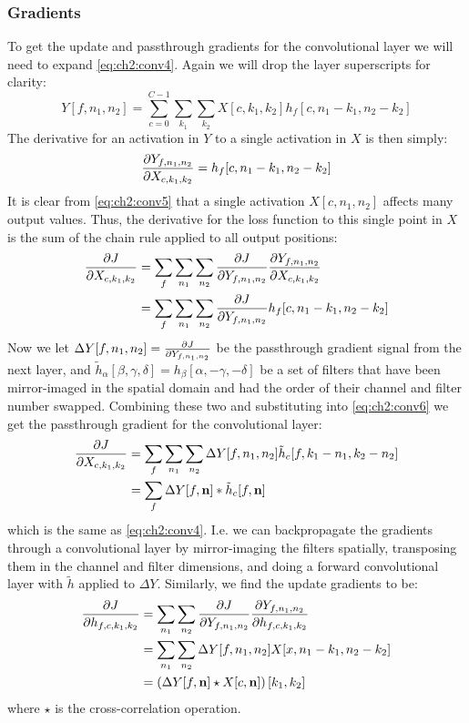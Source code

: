 \subsubsection{Gradients}\label{sec:ch2:conv_grad}
To get the update and passthrough gradients for the convolutional layer we will need to expand
\eqref{eq:ch2:conv4}. Again we will drop the layer superscripts for clarity:
\begin{equation}
  Y[f, n_1, n_2] = \sum_{c=0}^{C-1} \sum_{k_1} \sum_{k_2} X[c, k_1, k_2]
  h_f[c, n_1-k_1, n_2-k_2] \label{eq:ch2:conv5}
\end{equation}
The derivative for an activation in $Y$ to a single activation in $X$ is then
simply:
\begin{equation}
  \frac{\partial Y_{f, n_1, n_2}}{\partial X_{c, k_1, k_2}} = h_f[c, n_1 - k_1, n_2 - k_2]
\end{equation}
It is clear from \eqref{eq:ch2:conv5} that a single activation $X[c, n_1, n_2]$ affects
many output values. Thus, the derivative for the loss function to this single
point in $X$ is the sum of the chain rule applied to all output positions:
\begin{align}
  \frac{\partial J}{\partial X_{c,k_1,k_2}} &= \sum_f \sum_{n_1} \sum_{n_2} \frac{\partial J}{\partial Y_{f, n_1, n_2}}
  \frac{\partial Y_{f, n_1, n_2}}{\partial X_{c,k_1,k_2}} \\
  &= \sum_f \sum_{n_1} \sum_{n_2} \frac{\partial J}{\partial Y_{f, n_1, n_2}} h_f[c, n_1 - k_1, n_2 - k_2] \label{eq:ch2:conv6}
\end{align}
Now we let $\Delta Y[f, n_1, n_2] = \frac{\partial J}{\partial Y_{f, n_1, n_2}}$ be the passthrough gradient
signal from the next layer, and $\tilde{h}_\alpha[\beta, \gamma, \delta] = h_\beta[\alpha, -\gamma, -\delta]$
be a set of filters that have been mirror-imaged in the spatial domain and had
the order of their channel and filter number swapped. Combining these two and
substituting into \eqref{eq:ch2:conv6} we get the passthrough gradient for the
convolutional layer:
\begin{align}
  \frac{\partial J}{\partial X_{c,k_1,k_2}} &= \sum_f \sum_{n_1} \sum_{n_2} \Delta Y[f, n_1, n_2] \tilde{h}_c[f, k_1-n_1, k_2-n_2 ] \\
                          &= \sum_f \Delta Y[f, \mathbf{n}] \ast \tilde{h}_c[f, \mathbf{n}]
\end{align}
which is the same as \eqref{eq:ch2:conv4}. I.e. we can backpropagate the
gradients through a convolutional layer by mirror-imaging the filters spatially,
transposing them in the channel and filter dimensions, and doing a forward
convolutional layer with $\tilde{h}$ applied to $\Delta Y$. Similarly, we
find the update gradients to be:
\begin{align}
  \frac{\partial J}{\partial h_{f,c,k_1,k_2}} &= \sum_{n_1} \sum_{n_2} \frac{\partial J}{\partial Y_{f, n_1, n_2}} \frac{\partial Y_{f, n_1, n_2}}{\partial h_{f, c, k_1, k_2}} \\
                            &= \sum_{n_1} \sum_{n_2} \Delta Y[f, n_1, n_2] X[x, n_1-k_1, n_2-k_2 ] \\
                            &= \left(\Delta Y[f, \mathbf{n}] \star X[c, \mathbf{n}]\right)[k_1, k_2]
\end{align}
where $\star$ is the cross-correlation operation.


